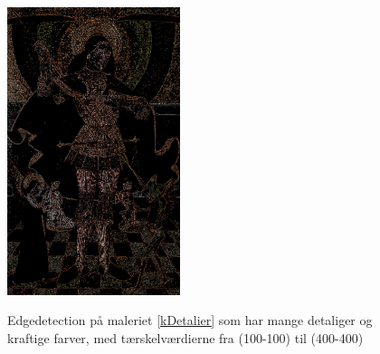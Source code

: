 \begin{figure}[p]
{        \includegraphics[angle=0,width=0.45\textwidth]{afsnit/afprovning/billeder/thressholds/krafitige_farver/krafite_detalier/1_iteration/300-300.png}
        \label{300-300}}\hspace{1em}
    \label{allesammen1}
    \caption{Edgedetection på maleriet \ref{kDetalier} som har mange detaliger og kraftige farver, med tærskelværdierne fra (100-100) til (400-400)}
\end{figure}

\clearpage

